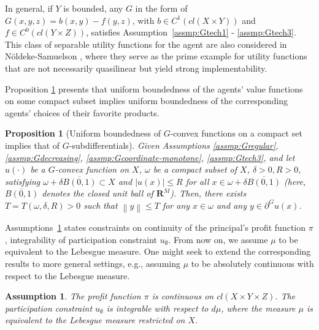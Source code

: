 \documentclass[a4paper, 11pt]{amsart}
\numberwithin{equation}{section}
\theoremstyle{plain}
\newtheorem{proposition}[theorem]{Proposition}
\newtheorem{assumption}{Assumption}
\theoremstyle{definition}
\theoremstyle{remark}
\newcommand{\R}{\mathbf{R}}
\newcommand{\norm}[1]{\left\lVert#1\right\rVert}
\begin{document}
In general, if $Y$ is bounded, any $G$ in the form of $G(x,y,z) = b(x,y) - f(y,z)$, with $b \in C^1(cl(X\times Y))$ and $f\in C^0(cl(Y \times Z))$, satisfies Assumption~\ref{assmp:Gtech1} - \ref{assmp:Gtech3}. %
This class of separable utility functions for the agent are also considered in Nöldeke-Samuelson \cite{NoldekeSamuelson15p}, where they serve as the prime example for utility functions that are not necessarily quasilinear but yield strong implementability. 
\medskip


Proposition \ref{Subdiff/Bdd} presents that uniform boundedness of the agents' value functions on some compact subset implies uniform boundedness of the corresponding agents' choices of their favorite products. \medskip

\begin{proposition}[{Uniform boundedness of $G$-convex functions on a compact set implies that of $G$-subdifferentials}]\label{Subdiff/Bdd}
	Given Assumptions \ref{assmp:Gregular}, \ref{assmp:Gdecreasing}, \ref{assmp:Gcoordinate-monotone}, \ref{assmp:Gtech3}, and let $u(\cdot)$ be a $G$-convex function on $X$, $\omega$ be a compact subset of $X$, $\delta>0, R>0$, satisfying $\omega+\delta\overline{B(0,1)}\subset X$ and $|u(x)|\le R$ for all $x\in \omega + \delta \overline{B(0,1)}$ (here, $\overline{B(0,1)}$ denotes the closed unit ball of $\R^M$). Then, there exists $T = T(\omega,\delta, R) > 0$ such that $\norm{y}\le T$ for any $x \in \omega$ and any $y\in \partial^Gu(x)$.
\end{proposition}




Assumptions~\ref{assmp:Pi1} states constraints on continuity of the principal's profit function $\pi$, integrability of participation constraint $u_{\emptyset}$. From now on, we assume $\mu$ to be equivalent to the Lebesgue measure. One might seek to extend the corresponding results to more general settings, e.g., assuming $\mu$ to be absolutely continuous with respect to the Lebesgue measure.


\begin{assumption}\label{assmp:Pi1}
	The profit function $\pi$ is continuous on $cl(X\times Y\times Z)$. The participation constraint $u_{\emptyset}$ is integrable with respect to $d \mu$, where the measure  $\mu$ is equivalent to the Lebesgue measure restricted on $X$.%
\end{assumption}
\end{document}
